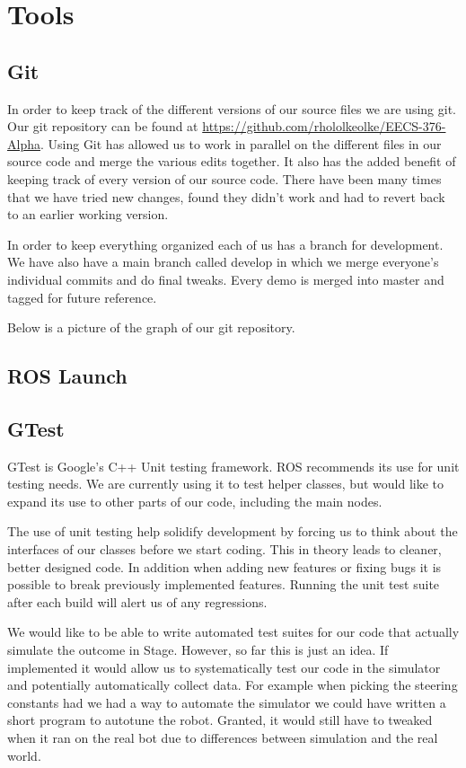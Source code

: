 \section{Tools}

\subsection{Git}

In order to keep track of the different versions of our source files
we are using git.  Our git repository can be found at
\url{https://github.com/rhololkeolke/EECS-376-Alpha}.  Using Git has
allowed us to work in parallel on the different files in our source
code and merge the various edits together.  It also has the added
benefit of keeping track of every version of our source code. There
have been many times that we have tried new changes, found they didn't
work and had to revert back to an earlier working version.

In order to keep everything organized each of us has a branch for
development.  We have also have a main branch called develop in which
we merge everyone's individual commits and do final tweaks. Every
demo is merged into master and tagged for future reference.

Below is a picture of the graph of our git repository.

\subsection{ROS Launch}



\subsection{GTest}

GTest is Google's C++ Unit testing
framework.\cite{http://code.google.com/p/googletest/} ROS recommends
its use for unit testing needs.  We are currently using it to test
helper classes, but would like to expand its use to other parts of our
code, including the main nodes.

The use of unit testing help solidify development by forcing us to
think about the interfaces of our classes before we start coding.
This in theory leads to cleaner, better designed code.  In addition
when adding new features or fixing bugs it is possible to break
previously implemented features.  Running the unit test suite after
each build will alert us of any regressions.

We would like to be able to write automated test suites for our code
that actually simulate the outcome in Stage. However, so far this is
just an idea.  If implemented it would allow us to systematically test
our code in the simulator and potentially automatically collect data.
For example when picking the steering constants had we had a way to
automate the simulator we could have written a short program to
autotune the robot.  Granted, it would still have to tweaked when it
ran on the real bot due to differences between simulation and the real world.
